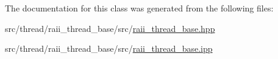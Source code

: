 The documentation for this class was generated from the following files\-:\begin{DoxyCompactItemize}
\item 
src/thread/raii\-\_\-thread\-\_\-base/src/\hyperlink{raii__thread__base_8hpp}{raii\-\_\-thread\-\_\-base.\-hpp}\item 
src/thread/raii\-\_\-thread\-\_\-base/src/\hyperlink{raii__thread__base_8ipp}{raii\-\_\-thread\-\_\-base.\-ipp}\end{DoxyCompactItemize}
